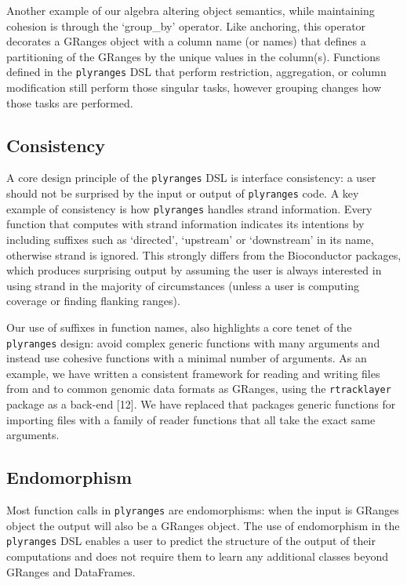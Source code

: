 \documentclass[10pt,letterpaper]{article}
\begin{document}
Another example of our algebra altering object semantics, while
maintaining cohesion is through the `group\_by' operator. Like
anchoring, this operator decorates a GRanges object with a column name
(or names) that defines a partitioning of the GRanges by the unique
values in the column(s). Functions defined in the \texttt{plyranges} DSL
that perform restriction, aggregation, or column modification still
perform those singular tasks, however grouping changes how those tasks
are performed.

\hypertarget{consistency}{%
\subsection{Consistency}\label{consistency}}

A core design principle of the \texttt{plyranges} DSL is interface
consistency: a user should not be surprised by the input or output of
\texttt{plyranges} code. A key example of consistency is how
\texttt{plyranges} handles strand information. Every function that
computes with strand information indicates its intentions by including
suffixes such as `directed', `upstream' or `downstream' in its name,
otherwise strand is ignored. This strongly differs from the Bioconductor
packages, which produces surprising output by assuming the user is
always interested in using strand in the majority of circumstances
(unless a user is computing coverage or finding flanking ranges).

Our use of suffixes in function names, also highlights a core tenet of
the \texttt{plyranges} design: avoid complex generic functions with many
arguments and instead use cohesive functions with a minimal number of
arguments. As an example, we have written a consistent framework for
reading and writing files from and to common genomic data formats as
GRanges, using the \texttt{rtracklayer} package as a back-end {[}12{]}.
We have replaced that packages generic functions for importing files
with a family of reader functions that all take the exact same
arguments.

\hypertarget{endomorphism}{%
\subsection{Endomorphism}\label{endomorphism}}

Most function calls in \texttt{plyranges} are endomorphisms: when the
input is GRanges object the output will also be a GRanges object. The
use of endomorphism in the \texttt{plyranges} DSL enables a user to
predict the structure of the output of their computations and does not
require them to learn any additional classes beyond GRanges and
DataFrames.
\end{document}
